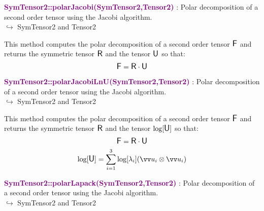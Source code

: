 \textcolor{purple}{\textbf{SymTensor2::polarJacobi(SymTensor2,Tensor2)}}\label{SymTensor2::polarJacobi(SymTensor2,Tensor2)} : Polar decomposition of a second order tensor using the Jacobi algorithm.\\ \hspace*{5mm}$\hookrightarrow$ SymTensor2 and Tensor2

This method computes the polar decomposition of a second order tensor $\mbox{\large\ensuremath{\mathsf{F}}}$ and returns the symmetric tensor $\mbox{\large\ensuremath{\mathsf{R}}}$ and the tensor $\mbox{\large\ensuremath{\mathsf{U}}}$ so that:
\begin{equation*}
\mbox{\large\ensuremath{\mathsf{F}}} = \mbox{\large\ensuremath{\mathsf{R}}} \cdot \mbox{\large\ensuremath{\mathsf{U}}}
\end{equation*}

\textcolor{purple}{\textbf{SymTensor2::polarJacobiLnU(SymTensor2,Tensor2)}}\label{SymTensor2::polarJacobiLnU(SymTensor2,Tensor2)} : Polar decomposition of a second order tensor using the Jacobi algorithm.\\ \hspace*{5mm}$\hookrightarrow$ SymTensor2 and Tensor2

This method computes the polar decomposition of a second order tensor $\mbox{\large\ensuremath{\mathsf{F}}}$ and returns the symmetric tensor $\mbox{\large\ensuremath{\mathsf{R}}}$ and the tensor $\log[\mbox{\large\ensuremath{\mathsf{U}}}]$ so that:
\begin{equation*}
\mbox{\large\ensuremath{\mathsf{F}}} = \mbox{\large\ensuremath{\mathsf{R}}} \cdot \mbox{\large\ensuremath{\mathsf{U}}}
\end{equation*}
\begin{equation*}
\log [\U] =\sum _{i=1}^{3}\log[\lambda_{i}](\overrightarrow{u}_{i}\otimes \overrightarrow{u}_{i})
\end{equation*}

\textcolor{purple}{\textbf{SymTensor2::polarLapack(SymTensor2,Tensor2)}}\label{SymTensor2::polarLapack(SymTensor2,Tensor2)} : Polar decomposition of a second order tensor using the Jacobi algorithm.\\ \hspace*{5mm}$\hookrightarrow$ SymTensor2 and Tensor2

